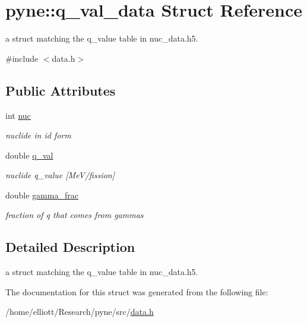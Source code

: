 \hypertarget{structpyne_1_1q__val__data}{\section{pyne\-:\-:q\-\_\-val\-\_\-data Struct Reference}
\label{structpyne_1_1q__val__data}
}


a struct matching the q\-\_\-value table in nuc\-\_\-data.\-h5.  




{\ttfamily \#include $<$data.\-h$>$}

\subsection*{Public Attributes}
\begin{DoxyCompactItemize}
\item 
\hypertarget{structpyne_1_1q__val__data_a39dbf1ad0347f0f68f09c94a9ff9157f}{int \hyperlink{structpyne_1_1q__val__data_a39dbf1ad0347f0f68f09c94a9ff9157f}{nuc}}\label{structpyne_1_1q__val__data_a39dbf1ad0347f0f68f09c94a9ff9157f}

\begin{DoxyCompactList}\small\item\em nuclide in id form \end{DoxyCompactList}\item 
\hypertarget{structpyne_1_1q__val__data_a8016ec428535fddb8cba5005511d4a8a}{double \hyperlink{structpyne_1_1q__val__data_a8016ec428535fddb8cba5005511d4a8a}{q\-\_\-val}}\label{structpyne_1_1q__val__data_a8016ec428535fddb8cba5005511d4a8a}

\begin{DoxyCompactList}\small\item\em nuclide q\-\_\-value \mbox{[}Me\-V/fission\mbox{]} \end{DoxyCompactList}\item 
\hypertarget{structpyne_1_1q__val__data_a5d47c172a924715d567a1b6119e20830}{double \hyperlink{structpyne_1_1q__val__data_a5d47c172a924715d567a1b6119e20830}{gamma\-\_\-frac}}\label{structpyne_1_1q__val__data_a5d47c172a924715d567a1b6119e20830}

\begin{DoxyCompactList}\small\item\em fraction of q that comes from gammas \end{DoxyCompactList}\end{DoxyCompactItemize}


\subsection{Detailed Description}
a struct matching the q\-\_\-value table in nuc\-\_\-data.\-h5. 

The documentation for this struct was generated from the following file\-:\begin{DoxyCompactItemize}
\item 
/home/elliott/\-Research/pyne/src/\hyperlink{data_8h}{data.\-h}\end{DoxyCompactItemize}
